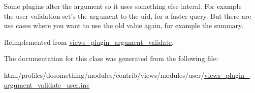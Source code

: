 Some plugins alter the argument so it uses something else interal. For example the user validation set's the argument to the uid, for a faster query. But there are use cases where you want to use the old value again, for example the summary. 

Reimplemented from \hyperlink{classviews__plugin__argument__validate_a35ebaf052ae4653ae5134afc11883c05}{views\_\-plugin\_\-argument\_\-validate}.

The documentation for this class was generated from the following file:\begin{DoxyCompactItemize}
\item 
html/profiles/dosomething/modules/contrib/views/modules/user/\hyperlink{views__plugin__argument__validate__user_8inc}{views\_\-plugin\_\-argument\_\-validate\_\-user.inc}\end{DoxyCompactItemize}
